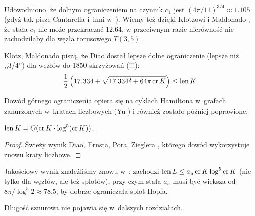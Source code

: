 Udowodniono, że dolnym ograniczeniem na czynnik $c_1$ jest $(4\pi/11)^{3/4} \approx 1.105$ (gdyż tak pisze Cantarella i~inni w~\cite[tw. 23]{cantarella02}).
Wiemy też dzięki Klotzowi i Maldonado \cite{klotz21}, że stała $c_1$ nie może przekraczać $12.64$, w przeciwnym razie nierówność nie zachodziłaby dla węzła torusowego $T(3, 5)$.
%
%

Klotz, Maldonado \cite{klotz21} piszą, że Diao dostał lepsze dolne ograniczenie (lepsze niż ,,3/4'') dla węzłów do 1850 skrzyżowań (!!!):
\begin{equation}
    \frac 12 \left(17.334 + \sqrt{17.334^2 + 64 \pi \operatorname{cr} K}\right) \le \operatorname{len} K.
\end{equation}

Dowód górnego ograniczenia opiera się na cyklach Hamiltona w~grafach zanurzonych w~kratach liczbowych (Yu \cite{yu04}) i również zostało później poprawione:


\begin{proposition}
    $\operatorname{len} K = O(\operatorname{cr} K \cdot \log^5(\operatorname{cr} K))$.
\end{proposition}

\begin{proof}
    Świeży wynik Diao, Ernsta, Pora, Zieglera \cite{diao19}, którego dowód wykorzystuje znowu kraty liczbowe.
\end{proof}

Jakościowy wynik znaleźliśmy znowu w~\cite{klotz21}: zachodzi $\operatorname{len} L \le a_u \operatorname{cr} K \log^5 \operatorname{cr} K$ (nie tylko dla węzłów, ale też splotów), przy czym stała $a_u$ musi być większa od $8\pi/\log^5 2 \approx 78.5$, by dobrze ograniczała splot Hopfa.

Długość sznurowa nie pojawia się w~dalszych rozdziałach.

%


